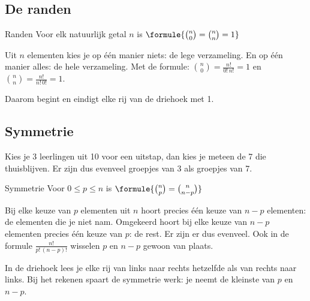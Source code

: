 \subsection{De randen}

\begin{theorie}
\begin{stelling}{Randen}
Voor elk natuurlijk getal $n$ is \quad $\formule{\binom{n}{0} = \binom{n}{n} = 1}$
\end{stelling}

\begin{bewijs}
Uit $n$ elementen kies je op één manier niets: de lege verzameling. En op één manier alles: de hele verzameling. Met de formule: $\binom{n}{0} = \frac{n!}{0!\,n!} = 1$ en $\binom{n}{n} = \frac{n!}{n!\,0!} = 1$.
\end{bewijs}
\end{theorie}

Daarom begint en eindigt elke rij van de driehoek met 1.

\subsection{Symmetrie}

Kies je 3 leerlingen uit 10 voor een uitstap, dan kies je meteen de 7 die thuisblijven. Er zijn dus evenveel groepjes van 3 als groepjes van 7.

\begin{theorie}
\begin{stelling}{Symmetrie}
Voor $0 \leqslant p \leqslant n$ is \quad $\formule{\binom{n}{p} = \binom{n}{n - p}}$
\end{stelling}

\begin{bewijs}
Bij elke keuze van $p$ elementen uit $n$ hoort precies één keuze van $n - p$ elementen: de elementen die je niet nam. Omgekeerd hoort bij elke keuze van $n - p$ elementen precies één keuze van $p$: de rest. Er zijn er dus evenveel. Ook in de formule $\frac{n!}{p!\,(n - p)!}$ wisselen $p$ en $n - p$ gewoon van plaats.
\end{bewijs}
\end{theorie}

In de driehoek lees je elke rij van links naar rechts hetzelfde als van rechts naar links. Bij het rekenen spaart de symmetrie werk: je neemt de kleinste van $p$ en $n - p$.


